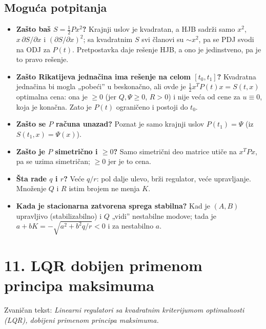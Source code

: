 \documentclass[11pt,a4paper,parskip=half,headsepline,numbers=noenddot]{scrartcl}
\begin{document}
\subsection{Moguća potpitanja}

\begin{itemize}
\item \textbf{Zašto baš \(S = \frac12Px^2\)?} Krajnji uslov je kvadratan, a HJB sadrži samo \(x^2\), \(x\,\partial S/\partial x\) i \((\partial S/\partial x)^2\); sa kvadratnim \(S\) svi članovi su \(\sim x^2\), pa se PDJ svodi na ODJ za \(P(t)\). Pretpostavka daje rešenje HJB, a ono je jedinstveno, pa je to pravo rešenje.
\item \textbf{Zašto Rikatijeva jednačina ima rešenje na celom \([t_0, t_1]\)?} Kvadratna jednačina bi mogla „pobeći'' u beskonačno, ali ovde je \(\frac12x^TP(t)x = S(t, x)\) optimalna cena: ona je \(\ge 0\) (jer \(Q, \Psi \ge 0\), \(R > 0\)) i nije veća od cene za \(u \equiv 0\), koja je konačna. Zato je \(P(t)\) ograničeno i postoji do \(t_0\).
\item \textbf{Zašto se \(P\) računa unazad?} Poznat je samo krajnji uslov \(P(t_1) = \Psi\) (iz \(S(t_1, x) = \Psi(x)\)).
\item \textbf{Zašto je \(P\) simetrično i \(\ge 0\)?} Samo simetrični deo matrice utiče na \(x^TPx\), pa se uzima simetričan; \(\ge 0\) jer je to cena.
\item \textbf{Šta rade \(q\) i \(r\)?} Veće \(q/r\): pol dalje ulevo, brži regulator, veće upravljanje. Množenje \(Q\) i \(R\) istim brojem ne menja \(K\).
\item \textbf{Kada je stacionarna zatvorena sprega stabilna?} Kad je \((A, B)\) upravljivo (stabilizabilno) i \(Q\) „vidi'' nestabilne modove; tada je \(a + bK = -\sqrt{a^2 + b^2q/r} < 0\) i za nestabilno \(a\).
\end{itemize}

\section{11. LQR dobijen primenom principa maksimuma}

Zvaničan tekst: \emph{Linearni regulatori sa kvadratnim kriterijumom optimalnosti (LQR), dobijeni primenom principa maksimuma.}
\end{document}

